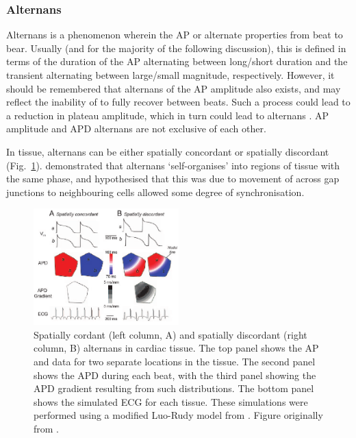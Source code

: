 \documentclass[../thesis-main.tex]{subfiles}
\begin{document}
 \subsubsection{Alternans}
 \label{subsubsec:alternans}
 Alternans is a phenomenon wherein the AP or \cai{} alternate properties from beat to bear. Usually (and for the majority of the following discussion), this is defined in terms of the duration of the AP alternating between long/short duration and the  \cai{} transient alternating between large/small magnitude, respectively. However, it should be remembered that alternans of the AP amplitude also exists, and may reflect the inability of \ina{} to fully recover between beats. Such a process could lead to a reduction in plateau amplitude, which in turn could lead to \cai{} alternans \citep{Clusin2003}. AP amplitude and APD alternans are not exclusive of each other.
 
 In tissue, alternans can be either spatially concordant or spatially discordant (Fig.~\ref{fig:alternans}). \citet{Qian2001} demonstrated that \ca{} alternans `self-organises' into regions of tissue with the same phase, and hypothesised that this was due to movement of \ca{} across gap junctions to neighbouring cells allowed some degree of synchronisation.
 \begin{figure}
  \centering
  \includegraphics[width=0.5\textwidth]{alternans}
  \caption[Spatially cordant and spatially discordant alternans in cardiac tissue]{Spatially cordant (left column, A) and spatially discordant (right column, B) alternans in cardiac tissue. The top panel shows the AP and \cai{} data for two separate locations in the tissue. The second panel shows the APD during each beat, with the third panel showing the APD gradient resulting from such distributions. The bottom panel shows the simulated ECG for each tissue. These simulations were performed using a modified Luo-Rudy model from \citet{Qu2000}. Figure originally from \citet{Weiss2006}.}
  \label{fig:alternans}
 \end{figure}
 
\end{document}
